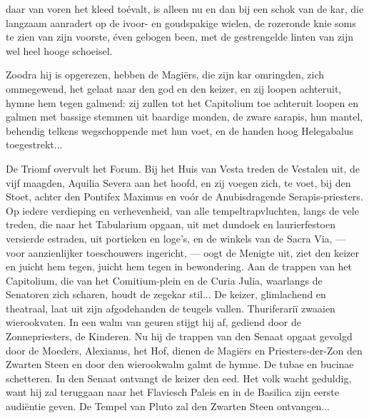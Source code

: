 \documentclass[a4paper, 12pt, oneside, dutch]{article}
\begin{document}
daar van voren het kleed toévalt, is alleen nu en dan bij een schok van de kar, die langzaam aanradert op de ivoor- en goudspakige wielen, de rozeronde knie soms te zien van zijn voorste, éven gebogen been, met de gestrengelde linten van zijn wel heel hooge schoeisel.

Zoodra hij is opgerezen, hebben de Magiërs, die zijn kar omringden, zich ommegewend, het gelaat naar den god en den keizer, en zij loopen achteruit, hymne hem tegen galmend: zij zullen tot het Capitolium toe achteruit loopen en galmen met bassige stemmen uit baardige monden, de zware sarapis, hun mantel, behendig telkens wegschoppende met hun voet, en de handen hoog Helegabalus toegestrekt...

De Triomf overvult het Forum. Bij het Huis van Vesta treden de Vestalen uit, de vijf maagden, Aquilia Severa aan het hoofd, en zij voegen zich, te voet, bij den Stoet, achter den Pontifex Maximus en voór de Anubisdragende Serapis-priesters. Op iedere verdieping en verhevenheid, van alle tempeltrapvluchten, langs de vele treden, die naar het Tabularium opgaan, uit met dundoek en laurierfestoen versierde estraden, uit portieken en loge's, en de winkels van de Sacra Via, --- voor aanzienlijker toeschouwers ingericht, --- oogt de Menigte uit, ziet den keizer en juicht hem tegen, juicht hem tegen in bewondering. Aan de trappen van het Capitolium, die van het Comitium-plein en de Curia Julia, waarlangs de Senatoren zich scharen, houdt de zegekar stil... De keizer, glimlachend en theatraal, laat uit zijn afgodehanden de teugels vallen. Thuriferariï zwaaien wierookvaten. In een walm van geuren stijgt hij af, gediend door de Zonnepriesters, de Kinderen. Nu hij de trappen van den Senaat opgaat gevolgd door de Moeders, Alexianus, het Hof, dienen de Magiërs en Priesters-der-Zon den Zwarten Steen en door den wierookwalm galmt de hymne. De tubae en bucinae schetteren. In den Senaat ontvangt de keizer den eed. Het volk wacht geduldig, want hij zal teruggaan naar het Flaviesch Paleis en in de Basilica zijn eerste audiëntie geven. De Tempel van Pluto zal den Zwarten Steen ontvangen...
\end{document}
